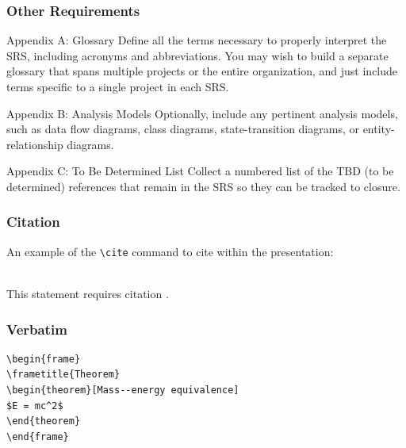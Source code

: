 \documentclass{beamer}
\begin{document}
\begin{frame}
\frametitle{Other Requirements}
\begin{block}{Appendix A: Glossary}
Define all the terms necessary to properly interpret the SRS, including acronyms and abbreviations. You may wish to build a separate glossary that spans multiple projects or the entire organization, and just include terms specific to a single project in each SRS.
\end{block}

\begin{block}{Appendix B: Analysis Models}
Optionally, include any pertinent analysis models, such as data  flow diagrams, class diagrams, state-transition diagrams, or entity-relationship diagrams.
\end{block}

\begin{block}{Appendix C: To Be Determined List}
Collect a numbered list of the TBD (to be determined) references that remain in the SRS so they can be tracked to closure.
\end{block}
\end{frame}

\begin{frame}[fragile] %
\frametitle{Citation}
An example of the \verb|\cite| command to cite within the presentation:\\~

This statement requires citation \cite{p1}.


\end{frame}


\begin{frame}[fragile] %
\frametitle{Verbatim}
\begin{example}
\begin{verbatim}
\begin{frame}
\frametitle{Theorem}
\begin{theorem}[Mass--energy equivalence]
$E = mc^2$
\end{theorem}
\end{frame}\end{verbatim}
\end{example}
\end{frame}
\end{document}
